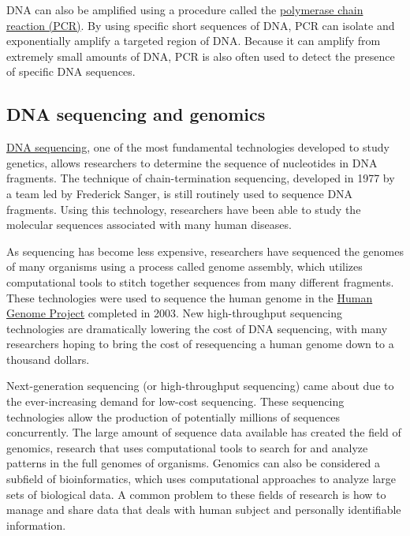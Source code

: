 DNA can also be amplified using a procedure called the \href{https://en.wikipedia.org/wiki/Polymerase_chain_reaction}{polymerase chain reaction (PCR)}. By using specific short sequences of DNA, PCR can isolate and exponentially amplify a targeted region of DNA. Because it can amplify from extremely small amounts of DNA, PCR is also often used to detect the presence of specific DNA sequences.

\hypertarget{dna-sequencing-and-genomics}{%
\subsection{DNA sequencing and genomics}\label{dna-sequencing-and-genomics}}

\href{https://en.wikipedia.org/wiki/DNA_sequencing}{DNA sequencing}, one of the most fundamental technologies developed to study genetics, allows researchers to determine the sequence of nucleotides in DNA fragments. The technique of chain-termination sequencing, developed in 1977 by a team led by Frederick Sanger, is still routinely used to sequence DNA fragments. Using this technology, researchers have been able to study the molecular sequences associated with many human diseases.

As sequencing has become less expensive, researchers have sequenced the genomes of many organisms using a process called genome assembly, which utilizes computational tools to stitch together sequences from many different fragments. These technologies were used to sequence the human genome in the \href{https://en.wikipedia.org/wiki/Human_Genome_Project}{Human Genome Project} completed in 2003. New high-throughput sequencing technologies are dramatically lowering the cost of DNA sequencing, with many researchers hoping to bring the cost of resequencing a human genome down to a thousand dollars.

Next-generation sequencing (or high-throughput sequencing) came about due to the ever-increasing demand for low-cost sequencing. These sequencing technologies allow the production of potentially millions of sequences concurrently. The large amount of sequence data available has created the field of genomics, research that uses computational tools to search for and analyze patterns in the full genomes of organisms. Genomics can also be considered a subfield of bioinformatics, which uses computational approaches to analyze large sets of biological data. A common problem to these fields of research is how to manage and share data that deals with human subject and personally identifiable information.

